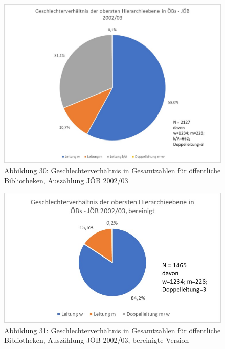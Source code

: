 \documentclass[a4paper,
fontsize=11pt,
oneside,
numbers=noperiodatend,
parskip=half-,
bibliography=totoc,
final
]{scrartcl}
\begin{document}
\begin{figure}
\centering
\includegraphics{img/Abb_30_JOB-2002_gesamt.jpg}
\caption{Abbildung 30: Geschlechterverhältnis in Gesamtzahlen für
öffentliche Bibliotheken, Auszählung JÖB 2002/03}
\end{figure}

\begin{figure}
\centering
\includegraphics{img/Abb_31_JOB-2002_gesamt_bereinigt.jpg}
\caption{Abbildung 31: Geschlechterverhältnis in Gesamtzahlen für
öffentliche Bibliotheken, Auszählung JÖB 2002/03, bereinigte Version}
\end{figure}
\end{document}
